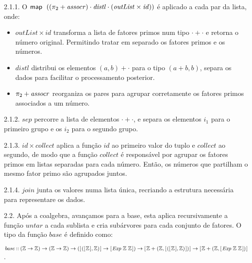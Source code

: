 \documentclass[11pt, a4paper, fleqn]{article}
\newcommand{\Conid}[1]{\mathit{#1}}
\newcommand{\Varid}[1]{\mathit{#1}}
\begin{document}
2.1.1. O \ensuremath{\map \;((\p2\mathbin{+}\Varid{assocr})\comp \Varid{distl}\comp (\Varid{outList}\times\Varid{id}))} é aplicado a cada par da lista, onde:
    \begin{itemize}
        \item \ensuremath{\Varid{outList}\times\Varid{id}} transforma a lista de fatores primos num tipo \ensuremath{\cdot +\cdot } e retorna o número original. Permitindo tratar em separado os fatores primos e os números. 
        \item \ensuremath{\Varid{distl}} distribui os elementos \ensuremath{(\Varid{a},\Varid{b})+\cdot } para o tipo \ensuremath{(\Varid{a}+\Varid{b},\Varid{b})}, separa os dados para facilitar o processamento posterior.
        \item \ensuremath{\p2\mathbin{+}\Varid{assocr}} reorganiza os pares para agrupar corretamente os fatores primos associados a um número.
    \end{itemize}

2.1.2. \ensuremath{\Varid{sep}} percorre a lista de elementos \ensuremath{\cdot +\cdot }, e separa os elementos \ensuremath{i_1} para o primeiro grupo e os \ensuremath{i_2} para o segundo grupo.

2.1.3. \ensuremath{\Varid{id}\times\Varid{collect}} aplica a função \ensuremath{\Varid{id}} ao primeiro valor do tuplo e \ensuremath{\Varid{collect}} ao segundo, de modo que a função \ensuremath{\Varid{collect}} é responsável por agrupar os fatores primos em listas separadas para cada número.
Então, os números que partilham o mesmo fator primo são agrupados juntos.

2.1.4. \ensuremath{\Varid{join}} junta os valores numa lista única, recriando a estrutura necessária para representare os dados.

2.2. Após a coalgebra, avançamos para a base, esta aplica recursivamente a função \ensuremath{\Varid{untar}} a cada sublista e cria subárvores para cada conjunto de fatores. O tipo da função \ensuremath{\Varid{base}} é definido como:

\ensuremath{\Varid{base}\mathbin{::}(\mathbb{Z}\to \mathbb{Z})\to (\mathbb{Z}\to \mathbb{Z})\to ([\mskip1.5mu ([\mskip1.5mu \mathbb{Z}\mskip1.5mu],\mathbb{Z})\mskip1.5mu]\to [\mskip1.5mu \Conid{Exp}\;\mathbb{Z}\;\mathbb{Z}\mskip1.5mu])\to [\mskip1.5mu \mathbb{Z}+(\mathbb{Z},[\mskip1.5mu ([\mskip1.5mu \mathbb{Z}\mskip1.5mu],\mathbb{Z})\mskip1.5mu])\mskip1.5mu]\to [\mskip1.5mu \mathbb{Z}+(\mathbb{Z},[\mskip1.5mu \Conid{Exp}\;\mathbb{Z}\;\mathbb{Z}\mskip1.5mu])\mskip1.5mu]}.
\end{document}
